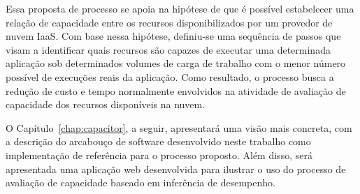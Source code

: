 Essa proposta de processo se apoia na hipótese de que é possível estabelecer uma
relação de capacidade entre os recursos disponibilizados por um provedor de nuvem
IaaS. Com base nessa hipótese, definiu-se uma sequência de passos
que visam a identificar quais recursos são capazes de executar uma determinada 
aplicação sob determinados volumes de carga de trabalho com o menor número
possível de execuções reais da aplicação. Como resultado, o processo busca
a redução de custo e tempo normalmente envolvidos na atividade de avaliação de
capacidade dos recursos disponíveis na nuvem.

O Capítulo~\ref{chap:capacitor}, a seguir, apresentará uma visão mais concreta,
com a descrição do arcabouço de software desenvolvido neste trabalho como implementação de referência
para o processo proposto. Além disso, será apresentada uma aplicação web desenvolvida para
ilustrar o uso do processo de avaliação de capacidade
baseado em inferência de desempenho. 

   
